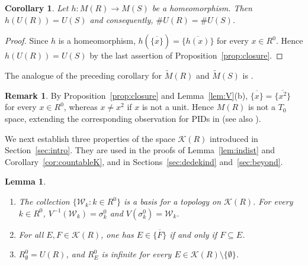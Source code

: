 \documentclass[12pt,reqno,a4paper]{amsart}
\newcommand{\K}{\mathcal{K}}
\newcommand{\W}{\mathcal{W}}
\newcommand{\clo}[1]{\overline{\{#1\}}}
\theoremstyle{plain}
\newtheorem{lemma}[theorem]{Lemma}
\newtheorem{corollary}[theorem]{Corollary}
\theoremstyle{definition}
\newtheorem{remark}[theorem]{Remark}
\begin{document}
\begin{corollary}\label{cor:units}
Let $h\colon M(R)\to M(S)$ be a homeomorphism. Then $h(U(R))=U(S)$ and consequently, $\#U(R)=\#U(S)$.
\end{corollary}
\begin{proof}
Since $h$ is a homeomorphism, $h(\clo{x})=\clo{h(x)}$ for every $x\in R^0$. Hence $h(U(R))=U(S)$ by the last assertion of Proposition~\ref{prop:closure}.
\end{proof}
The analogue of the preceding corollary for $\widetilde{M}(R)$ and $\widetilde{M}(S)$ is \cite[Theorem~5.5]{MaciasOrtiz}.
\begin{remark}\label{rem:T0}
By Proposition~\ref{prop:closure} and Lemma~\ref{lem:V}(b), $\clo{x}=\clo{x^2}$ for every $x\in R^0$, whereas $x\neq x^2$ if $x$ is not a unit. Hence $M(R)$ is not a $T_0$ space, extending the corresponding observation for PIDs in \cite{MaciasDomains} (see also \cite[Theorem~2.1(13)]{MaciasOrtiz}).
\end{remark}

We next establish three properties of the space $\K(R)$ introduced in Section~\ref{sec:intro}. They are used in the proofs of Lemma~\ref{lem:indist} and Corollary~\ref{cor:countableK}, and in Sections~\ref{sec:dedekind} and~\ref{sec:beyond}.

\begin{lemma}\label{lem:K}
\begin{enumerate}[label=\textup{(\alph*)}]
\item The collection $\{\W_k:k\in R^0\}$ is a basis for a topology on $\K(R)$. For every $k\in R^0$, $V^{-1}(\W_k)=\sigma_k^0$ and $V(\sigma_k^0)=\W_k$.
\item For all $E,F\in\K(R)$, one has $E\in\clo{F}$ if and only if $F\subseteq E$.
\item $R^0_\emptyset=U(R)$, and $R^0_E$ is infinite for every $E\in\K(R)\setminus\{\emptyset\}$.
\end{enumerate}
\end{lemma}
\end{document}
